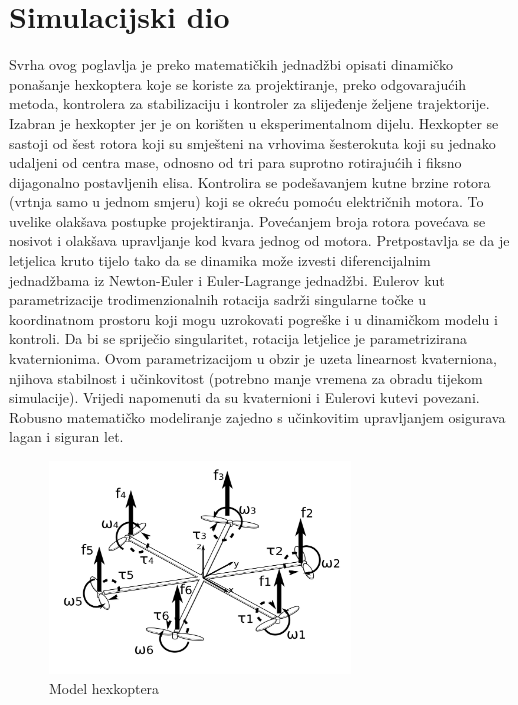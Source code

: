 \documentclass[times, utf8, diplomski]{fer}
\begin{document}
{\section{Simulacijski dio}\label{sec:SimulacijskiDio}
Svrha ovog poglavlja je preko matematičkih jednadžbi opisati dinamičko ponašanje hexkoptera koje se koriste za projektiranje, preko odgovarajućih metoda, kontrolera  za stabilizaciju i kontroler za slijeđenje željene trajektorije. Izabran je hexkopter jer je on korišten u eksperimentalnom dijelu. Hexkopter se sastoji od šest rotora koji su smješteni na vrhovima šesterokuta koji su jednako udaljeni od centra mase, odnosno od tri para suprotno rotirajućih i fiksno dijagonalno postavljenih elisa.  Kontrolira se podešavanjem kutne brzine rotora (vrtnja samo u jednom smjeru) koji se okreću pomoću električnih motora. To uvelike olakšava postupke projektiranja. Povećanjem broja rotora povećava se nosivot i olakšava upravljanje kod kvara jednog od motora. Pretpostavlja se da je letjelica kruto tijelo tako da se dinamika može izvesti diferencijalnim jednadžbama iz Newton-Euler i Euler-Lagrange jednadžbi. Eulerov kut parametrizacije trodimenzionalnih rotacija sadrži singularne točke u koordinatnom prostoru koji mogu uzrokovati pogreške i u dinamičkom modelu i kontroli. Da bi se spriječio singularitet, rotacija letjelice je parametrizirana kvaternionima. Ovom parametrizacijom u obzir je uzeta linearnost kvaterniona, njihova stabilnost i učinkovitost (potrebno manje vremena za obradu tijekom simulacije). Vrijedi napomenuti da su kvaternioni i Eulerovi kutevi povezani. Robusno matematičko modeliranje zajedno s učinkovitim upravljanjem osigurava lagan i siguran let. 
\begin{figure}[htb]
\centering
\includegraphics[width=8cm]{img/model_hexcopter.png}
\caption{Model hexkoptera\protect\footnotemark}
\label{fig:model}
\end{figure}
}
\end{document}
